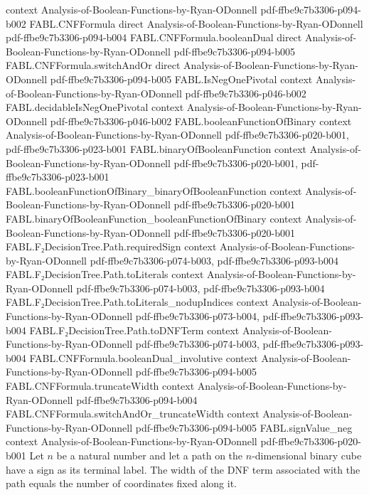 \begin{theorem}
  {context}
  {Analysis-of-Boolean-Functions-by-Ryan-ODonnell}
  {pdf-ffbe9c7b3306-p094-b002}
\proofstep
  {FABL.CNFFormula}
  {direct}
  {Analysis-of-Boolean-Functions-by-Ryan-ODonnell}
  {pdf-ffbe9c7b3306-p094-b004}
\proofstep
  {FABL.CNFFormula.booleanDual}
  {direct}
  {Analysis-of-Boolean-Functions-by-Ryan-ODonnell}
  {pdf-ffbe9c7b3306-p094-b005}
\proofstep
  {FABL.CNFFormula.switchAndOr}
  {direct}
  {Analysis-of-Boolean-Functions-by-Ryan-ODonnell}
  {pdf-ffbe9c7b3306-p094-b005}
\proofstep
  {FABL.IsNegOnePivotal}
  {context}
  {Analysis-of-Boolean-Functions-by-Ryan-ODonnell}
  {pdf-ffbe9c7b3306-p046-b002}
\proofstep
  {FABL.decidableIsNegOnePivotal}
  {context}
  {Analysis-of-Boolean-Functions-by-Ryan-ODonnell}
  {pdf-ffbe9c7b3306-p046-b002}
\proofstep
  {FABL.booleanFunctionOfBinary}
  {context}
  {Analysis-of-Boolean-Functions-by-Ryan-ODonnell}
  {pdf-ffbe9c7b3306-p020-b001,
    pdf-ffbe9c7b3306-p023-b001}
\proofstep
  {FABL.binaryOfBooleanFunction}
  {context}
  {Analysis-of-Boolean-Functions-by-Ryan-ODonnell}
  {pdf-ffbe9c7b3306-p020-b001,
    pdf-ffbe9c7b3306-p023-b001}
\proofstep
  {FABL.booleanFunctionOfBinary_binaryOfBooleanFunction}
  {context}
  {Analysis-of-Boolean-Functions-by-Ryan-ODonnell}
  {pdf-ffbe9c7b3306-p020-b001}
\proofstep
  {FABL.binaryOfBooleanFunction_booleanFunctionOfBinary}
  {context}
  {Analysis-of-Boolean-Functions-by-Ryan-ODonnell}
  {pdf-ffbe9c7b3306-p020-b001}
\proofstep
  {FABL.F₂DecisionTree.Path.requiredSign}
  {context}
  {Analysis-of-Boolean-Functions-by-Ryan-ODonnell}
  {pdf-ffbe9c7b3306-p074-b003,
    pdf-ffbe9c7b3306-p093-b004}
\proofstep
  {FABL.F₂DecisionTree.Path.toLiterals}
  {context}
  {Analysis-of-Boolean-Functions-by-Ryan-ODonnell}
  {pdf-ffbe9c7b3306-p074-b003,
    pdf-ffbe9c7b3306-p093-b004}
\proofstep
  {FABL.F₂DecisionTree.Path.toLiterals_nodupIndices}
  {context}
  {Analysis-of-Boolean-Functions-by-Ryan-ODonnell}
  {pdf-ffbe9c7b3306-p073-b004,
    pdf-ffbe9c7b3306-p093-b004}
\proofstep
  {FABL.F₂DecisionTree.Path.toDNFTerm}
  {context}
  {Analysis-of-Boolean-Functions-by-Ryan-ODonnell}
  {pdf-ffbe9c7b3306-p074-b003,
    pdf-ffbe9c7b3306-p093-b004}
\proofstep
  {FABL.CNFFormula.booleanDual_involutive}
  {context}
  {Analysis-of-Boolean-Functions-by-Ryan-ODonnell}
  {pdf-ffbe9c7b3306-p094-b005}
\proofstep
  {FABL.CNFFormula.truncateWidth}
  {context}
  {Analysis-of-Boolean-Functions-by-Ryan-ODonnell}
  {pdf-ffbe9c7b3306-p094-b004}
\proofstep
  {FABL.CNFFormula.switchAndOr_truncateWidth}
  {context}
  {Analysis-of-Boolean-Functions-by-Ryan-ODonnell}
  {pdf-ffbe9c7b3306-p094-b005}
\proofstep
  {FABL.signValue_neg}
  {context}
  {Analysis-of-Boolean-Functions-by-Ryan-ODonnell}
  {pdf-ffbe9c7b3306-p020-b001}
Let $n$ be a natural number and let a path on the $n$-dimensional binary cube have a
sign as its terminal label. The width of the DNF term associated with the path equals
the number of coordinates fixed along it.
\end{theorem}

